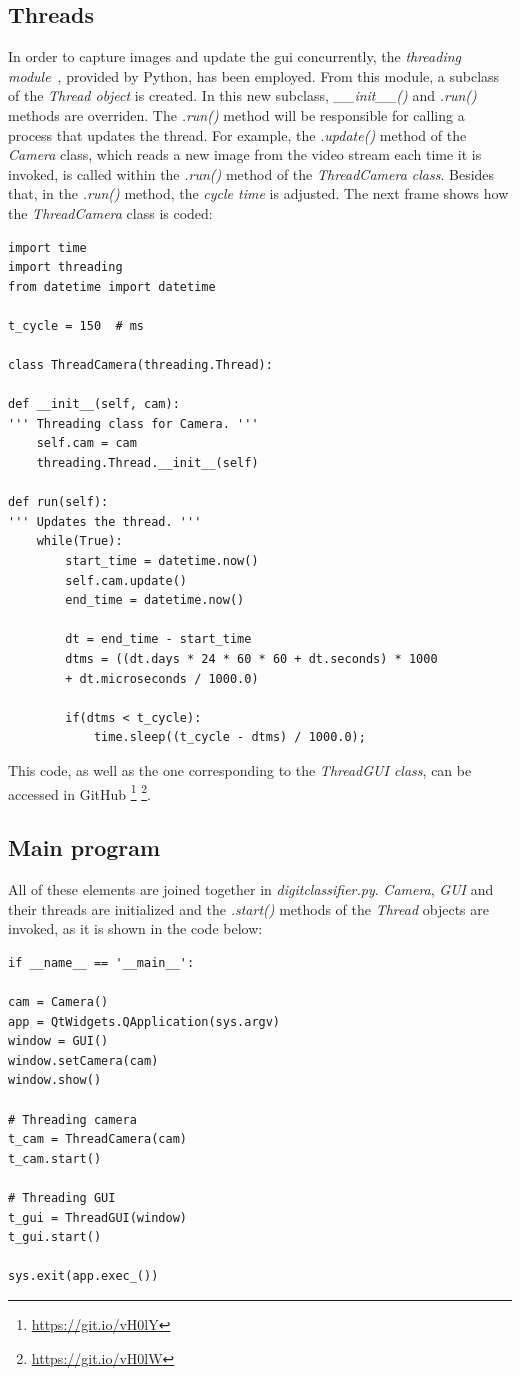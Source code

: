 \subsection{Threads} 
In order to capture images and update the \gls{gui} concurrently, the \emph{\textit{threading} module}~\cite{threading}, provided by Python, has been employed. From this module, a subclass of the \emph{\textit{Thread} object} is created. In this new subclass, \textit{\_\_init\_\_()} and \textit{.run()} methods are overriden. The \textit{.run()} method will be responsible for calling a process that updates the thread. For example, the \textit{.update()} method of the \textit{Camera} class, which reads a new image from the video stream each time it is invoked, is called within the \textit{.run()} method of the \emph{\textit{ThreadCamera} class}. Besides that, in the \textit{.run()} method, the \emph{cycle time} is adjusted. The next frame shows how the \textit{ThreadCamera} class is coded:
\begin{lstlisting}
import time
import threading
from datetime import datetime

t_cycle = 150  # ms

class ThreadCamera(threading.Thread):

def __init__(self, cam):
''' Threading class for Camera. '''
	self.cam = cam
	threading.Thread.__init__(self)

def run(self):
''' Updates the thread. '''
	while(True):
		start_time = datetime.now()
		self.cam.update()
		end_time = datetime.now()
		
		dt = end_time - start_time
		dtms = ((dt.days * 24 * 60 * 60 + dt.seconds) * 1000
		+ dt.microseconds / 1000.0)
		
		if(dtms < t_cycle):
			time.sleep((t_cycle - dtms) / 1000.0);
\end{lstlisting}
This code, as well as the one corresponding to the \emph{\textit{ThreadGUI} class}, can be accessed in GitHub \footnote{\url{https://git.io/vH0lY}} \footnote{\url{https://git.io/vH0lW}}.

\subsection{Main program}
All of these elements are joined together in \emph{\textit{digitclassifier.py}}. \textit{Camera}, \textit{GUI} and their threads are initialized and the \textit{.start()} methods of the \textit{Thread} objects are invoked, as it is shown in the code below:
\begin{lstlisting}
if __name__ == '__main__':

cam = Camera()
app = QtWidgets.QApplication(sys.argv)
window = GUI()
window.setCamera(cam)
window.show()

# Threading camera
t_cam = ThreadCamera(cam)
t_cam.start()

# Threading GUI
t_gui = ThreadGUI(window)
t_gui.start()

sys.exit(app.exec_())
\end{lstlisting}

